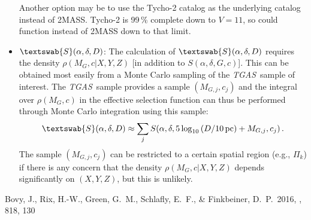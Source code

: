 \documentclass[12pt,preprint]{aastex}
\newcommand{\etal}{et al.}
\newcommand{\eg}{e.g.}
\newcommand{\tgas}{\emph{TGAS}}
\newcommand{\ra}{\ensuremath{\alpha}}
\newcommand{\dec}{\ensuremath{\delta}}
\newcommand{\essf}{\ensuremath{\textswab{S}}}
\newcommand{\pc}{\ensuremath{\,\mathrm{pc}}}
\begin{document}
\begin{itemize}
    Another option may be to use the Tycho-2 catalog as the underlying
    catalog instead of 2MASS. Tycho-2 is 99\,\% complete down to
    $V=11$, so could function instead of 2MASS down to that limit.
  \item $\essf(\ra,\dec,D)$: The calculation of $\essf(\ra,\dec,D)$
    requires the density $\rho(M_G,c|X,Y,Z)$ [in addition to
      $S(\ra,\dec,G,c)$]. This can be obtained most easily from a
    Monte Carlo sampling of the \tgas\ sample of interest. The
    \tgas\ sample provides a sample $(M_{G,j},c_j)$ and the integral
    over $\rho(M_G,c)$ in the effective selection function can thus be
    performed through Monte Carlo integration using this sample:
    \begin{equation}
      \essf(\ra,\dec,D) \approx \sum_j S(\ra,\dec,5\log_{10}\left(D/10\pc\right)+M_{G,j},c_j)\,.
    \end{equation}
    The sample $(M_{G,j},c_j)$ can be restricted to a certain spatial
    region (\eg, $\Pi_k$) if there is any concern that the density
    $\rho(M_G,c|X,Y,Z)$ depends significantly on $(X,Y,Z)$, but this
    is unlikely.
\end{itemize}

\begin{thebibliography}{}
\bibitem[Bovy \etal(2016)]{Bovy16a} Bovy, J., Rix, H.-W., Green,
  G.~M., Schlafly, E.~F., \& Finkbeiner, D.~P.\ 2016, \apj, 818, 130
\end{thebibliography}
\end{document}
